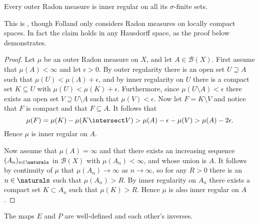 \documentclass[article, a4paper, 11pt, oneside]{memoir}
\numberwithin{equation}{chapter}
\newcommand{\calB}{\mathcal{B}}
\newcommand{\borel}[1]{\calB(#1)}
\begin{document}
\begin{proposition}
    \label{thm:outer-Radon-inner-regular-on-finites}
    Every outer Radon measure is inner regular on all its $\sigma$-finite sets.
\end{proposition}
%
This is \textcite[Proposition~7.5]{folland2007}, though Folland only considers Radon measures on locally compact spaces. In fact the claim holds in any Hausdorff space, as the proof below demonstrates.

\begin{proof}
    Let $\mu$ be an outer Radon measure on $X$, and let $A \in \borel{X}$. First assume that $\mu(A) < \infty$ and let $\epsilon > 0$. By outer regularity there is an open set $U \supseteq A$ such that $\mu(U) < \mu(A) + \epsilon$, and by inner regularity on $U$ there is a compact set $K \subseteq U$ with $\mu(U) < \mu(K) + \epsilon$. Furthermore, since $\mu(U \setminus A) < \epsilon$ there exists an open set $V \supseteq U \setminus A$ such that $\mu(V) < \epsilon$. Now let $F = K \setminus V$ and notice that $F$ is compact and that $F \subseteq A$. It follows that
    \begin{equation*}
        \mu(F)
            = \mu(K) - \mu(K \intersect V)
            > \mu(A) - \epsilon - \mu(V)
            > \mu(A) - 2\epsilon.
    \end{equation*}
    Hence $\mu$ is inner regular on $A$.

    Now assume that $\mu(A) = \infty$ and that there exists an increasing sequence $(A_n)_{n \in \naturals}$ in $\borel{X}$ with $\mu(A_n) < \infty$, and whose union is $A$. It follows by continuity of $\mu$ that $\mu(A_n) \to \infty$ as $n \to \infty$, so for any $R > 0$ there is an $n \in \naturals$ such that $\mu(A_n) > R$. By inner regularity on $A_n$ there exists a compact set $K \subset A_n$ such that $\mu(K) > R$. Hence $\mu$ is also inner regular on $A$.
\end{proof}

\newcommand{\mylistlabelfont}[1]{{\normalfont\color{linkcolor}\textit{#1}:}}

\begin{theorem}
    The maps $E$ and $P$ are well-defined and each other's inverses.
\end{theorem}
\end{document}
